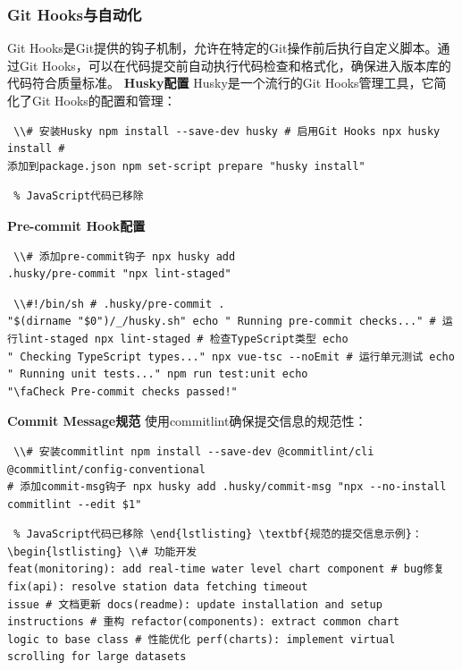 \subsubsection{Git Hooks与自动化}\label{git-hooksux4e0eux81eaux52a8ux5316} Git Hooks是Git提供的钩子机制，允许在特定的Git操作前后执行自定义脚本。通过Git
Hooks，可以在代码提交前自动执行代码检查和格式化，确保进入版本库的代码符合质量标准。 \textbf{Husky配置} Husky是一个流行的Git Hooks管理工具，它简化了Git Hooks的配置和管理：
\begin{lstlisting} \\# 安装Husky npm install --save-dev husky # 启用Git Hooks npx husky install #
添加到package.json npm set-script prepare "husky install" \end{lstlisting} \begin{lstlisting} % JavaScript代码已移除
\end{lstlisting} \textbf{Pre-commit Hook配置} \begin{lstlisting} \\# 添加pre-commit钩子 npx husky add
.husky/pre-commit "npx lint-staged" \end{lstlisting} \begin{lstlisting} \\#!/bin/sh # .husky/pre-commit .
"$(dirname "$0")/_/husky.sh" echo " Running pre-commit checks..." # 运行lint-staged npx lint-staged # 检查TypeScript类型 echo
" Checking TypeScript types..." npx vue-tsc --noEmit # 运行单元测试 echo " Running unit tests..." npm run test:unit echo
"\faCheck Pre-commit checks passed!" \end{lstlisting} \textbf{Commit Message规范} 使用commitlint确保提交信息的规范性：
\begin{lstlisting} \\# 安装commitlint npm install --save-dev @commitlint/cli @commitlint/config-conventional
# 添加commit-msg钩子 npx husky add .husky/commit-msg "npx --no-install commitlint --edit $1" \end{lstlisting}
\begin{lstlisting} % JavaScript代码已移除 \end{lstlisting} \textbf{规范的提交信息示例}： \begin{lstlisting} \\# 功能开发
feat(monitoring): add real-time water level chart component # bug修复 fix(api): resolve station data fetching timeout
issue # 文档更新 docs(readme): update installation and setup instructions # 重构 refactor(components): extract common chart
logic to base class # 性能优化 perf(charts): implement virtual scrolling for large datasets \end{lstlisting}
